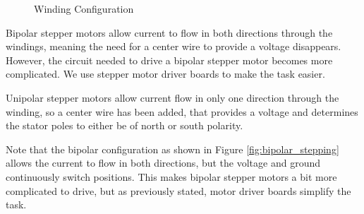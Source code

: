 \begin{figure}[htp] 
    \centering
    \hfill
    \caption{Winding Configuration}
    \label{fig:windings}
\end{figure}

Bipolar stepper motors allow current to flow in both directions through the windings, meaning the 
need for a center wire to provide a voltage disappears. However, the circuit needed to drive a 
bipolar stepper motor becomes more complicated. We use stepper motor driver boards to make the task 
easier. 

Unipolar stepper motors allow current flow in only one direction through the winding, so a center 
wire has been added, that provides a voltage and determines the stator poles to either be of north 
or south polarity. 


\newpage
Note that the bipolar configuration as shown in Figure \ref{fig:bipolar_stepping} allows the 
current to flow in both directions, but the voltage and ground continuously switch positions. This 
makes bipolar stepper motors a bit more complicated to drive, but as previously stated, motor 
driver boards simplify the task.

